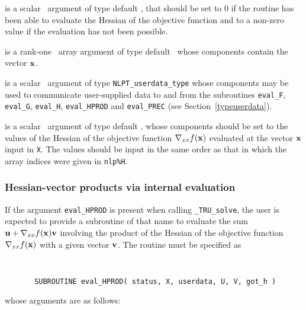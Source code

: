 \documentclass{galahad}
\newcommand{\packagename}{TRU}
\newcommand{\fullpackagename}{\libraryname\_\packagename}
\newcommand{\solver}{{\tt \fullpackagename\_solve}}
\begin{document}
\begin{description}
 is a scalar \intentout\ argument of type default \integer,
that should be set to 0 if the routine has been able to evaluate
the Hessian of the objective function
and to a non-zero value if the evaluation has not been possible.

 is a rank-one \intentin\ array argument of type default \realdp\
whose components contain the vector ${\mathbf{x}}$.

 is a scalar \intentinout\ argument of type
{\tt NLPT\_userdata\_type} whose components may be used
to communicate user-supplied data to and from the
subroutines {\tt eval\_F}, {\tt eval\_G},
{\tt eval\_H}, {\tt eval\_HPROD} and {\tt eval\_PREC}
(see Section~\ref{typeuserdata}).

 is a scalar \intentout\ argument of type default \realdp,
whose components should be set to the values of the Hessian
of the objective function $\nabla_{xx} f({\mathbf{x}})$
evaluated at the vector ${\mathbf{x}}$ input in {\tt X}. The values should
be input in the same order as that in which the array indices were
given in {\tt nlp\%H}.

\end{description}


\subsubsection{Hessian-vector products via internal evaluation\label{hvfv}}

If the argument {\tt eval\_HPROD} is present when calling \solver, the
user is expected to provide a subroutine of that name to evaluate the
sum ${\mathbf{u}} + \nabla_{xx} f({\mathbf{x}}) {\mathbf{v}}$ involving the
product of the Hessian of the objective function $\nabla_{xx} f({\mathbf{x}})$
with a given vector ${\mathbf{v}}$.
The routine must be specified as

\def\baselinestretch{0.8}
{\tt
\begin{verbatim}
       SUBROUTINE eval_HPROD( status, X, userdata, U, V, got_h )
\end{verbatim} }
\def\baselinestretch{1.0}
\noindent whose arguments are as follows:
\end{document}
